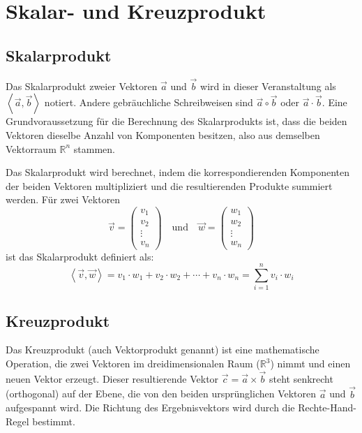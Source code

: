 \chapter{Skalar- und Kreuzprodukt}

\section{Skalarprodukt}

Das Skalarprodukt zweier Vektoren \(\vec{a}\) und \(\vec{b}\) wird in dieser
Veranstaltung als \(\left\langle \vec{a}, \vec{b} \right\rangle\) notiert.
Andere gebräuchliche Schreibweisen sind \(\vec{a} \circ \vec{b}\) oder
\(\vec{a} \cdot \vec{b}\). Eine Grundvoraussetzung für die Berechnung des
Skalarprodukts ist, dass die beiden Vektoren dieselbe Anzahl von Komponenten
besitzen, also aus demselben Vektorraum \(\mathbb{R}^n\) stammen.

Das Skalarprodukt wird berechnet, indem die korrespondierenden Komponenten der
beiden Vektoren multipliziert und die resultierenden Produkte summiert werden.
Für zwei Vektoren
\[ \vec{v} = \begin{pmatrix} v_1 \\ v_2 \\ \vdots \\ v_n \end{pmatrix} \quad \text{und} \quad \vec{w} = \begin{pmatrix} w_1 \\ w_2 \\ \vdots \\ w_n \end{pmatrix} \]
ist das Skalarprodukt definiert als:
\[ \left\langle \vec{v}, \vec{w} \right\rangle = v_1 \cdot w_1 + v_2 \cdot w_2 + \cdots + v_n \cdot w_n = \sum_{i=1}^{n} v_i \cdot w_i \]

\section{Kreuzprodukt}

Das Kreuzprodukt (auch Vektorprodukt genannt) ist eine mathematische Operation,
die zwei Vektoren im dreidimensionalen Raum (\(\mathbb{R}^3\)) nimmt und einen
neuen Vektor erzeugt. Dieser resultierende Vektor \(\vec{c} = \vec{a} \times
\vec{b}\) steht senkrecht (orthogonal) auf der Ebene, die von den beiden
ursprünglichen Vektoren \(\vec{a}\) und \(\vec{b}\) aufgespannt wird. Die
Richtung des Ergebnisvektors wird durch die Rechte-Hand-Regel bestimmt.

